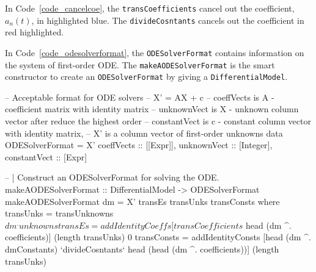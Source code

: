 In Code~\ref{code_cancelcoe}, the \verb|transCoefficients| cancel out the coefficient, $a_n(t)$, in highlighted blue. The \verb|divideCosntants| cancels out the coefficient in red highlighted.
\begin{listing}[ht]
\label{code_cancelcoe}
\end{listing}

In Code~\ref{code_odesolverformat}, the \verb|ODESolverFormat| contains information on the system of first-order ODE. The \verb|makeAODESolverFormat| is the smart constructor to create an \verb|ODESolverFormat| by giving a \verb|DifferentialModel|.
\begin{listing}[ht]
\begin{haskell1}
-- Acceptable format for ODE solvers
-- X' = AX + c
-- coeffVects is A - coefficient matrix with identity matrix
-- unknownVect is X - unknown column vector after reduce the highest order
-- constantVect is c - constant column vector with identity matrix, 
-- X' is a column vector of first-order unknowns
data ODESolverFormat = X'{
  coeffVects :: [[Expr]],
  unknownVect :: [Integer],
  constantVect :: [Expr]
}

-- | Construct an ODESolverFormat for solving the ODE.
makeAODESolverFormat :: DifferentialModel -> ODESolverFormat
makeAODESolverFormat dm = X' transEs transUnks transConsts
  where transUnks = transUnknowns $ dm ^. unknowns
        transEs = addIdentityCoeffs [transCoefficients $ head (dm ^. coefficients)] (length transUnks) 0
        transConsts = addIdentityConsts [head (dm ^. dmConstants) `divideCosntants` head (head (dm ^. coefficients))] (length transUnks)
\end{haskell1}
\label{code_odesolverformat}
\end{listing}

